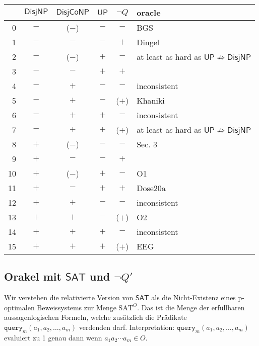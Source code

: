 \documentclass[nofonts]{uebung}
\def\hUP{\ensuremath{\mathsf{UP}}}
\def\hDisjNP{\ensuremath{\mathsf{DisjNP}}}
\def\hDisjCoNP{\ensuremath{\mathsf{DisjCoNP}}}
\def\hSAT{\ensuremath{\mathsf{SAT}}}
\begin{document}
\begin{tabular}{rccccl}
\toprule
{} & \hDisjNP & \hDisjCoNP &   \hUP &   $\neg Q$ &        oracle \\
\midrule
0  &    $-$ &    ($-$) &  $-$ &    $-$ &  BGS          \\
1  &    $-$ &      $-$ &  $-$ &    $+$ &  Dingel       \\
2  &    $-$ &    ($-$) &  $+$ &    $-$ &  at least as hard as $\hUP\not\Rightarrow\hDisjNP$             \\
3  &    $-$ &      $-$ &  $+$ &    $+$ &               \\
4  &    $-$ &      $+$ &  $-$ &    $-$ &  inconsistent \\
5  &    $-$ &      $+$ &  $-$ &  ($+$) &  Khaniki             \\
6  &    $-$ &      $+$ &  $+$ &    $-$ &  inconsistent \\
7  &    $-$ &      $+$ &  $+$ &  ($+$) &  at least as hard as $\hUP\not\Rightarrow\hDisjNP$             \\
8  &    $+$ &    ($-$) &  $-$ &    $-$ &  Sec. 3       \\
9  &    $+$ &      $-$ &  $-$ &    $+$ &               \\
10 &    $+$ &    ($-$) &  $+$ &    $-$ &  O1           \\
11 &    $+$ &      $-$ &  $+$ &    $+$ &  Dose20a      \\
12 &    $+$ &      $+$ &  $-$ &    $-$ &  inconsistent \\
13 &    $+$ &      $+$ &  $-$ &  ($+$) &  O2           \\
14 &    $+$ &      $+$ &  $+$ &    $-$ &  inconsistent \\
15 &    $+$ &      $+$ &  $+$ &  ($+$) &  EEG          \\
\bottomrule
\end{tabular}


\clearpage
\subsection*{Orakel mit $\hSAT$ und $\neg Q'$}
\setcounter{theorem}{0}

Wir verstehen die relativierte Version von $\hSAT$ als die Nicht-Existenz eines p-optimalen Beweissystems zur Menge $\mathrm{SAT}^O$.
Das ist die Menge der erfüllbaren aussagenlogischen Formeln, welche zusätzlich die Prädikate $\texttt{query}_m(a_1, a_2, \dots, a_m)$ verdenden darf.
Interpretation: $\texttt{query}_m(a_1, a_2, \dots, a_m)$ evaluiert zu 1 genau dann wenn $a_1a_2\cdots a_m\in O$.
\end{document}
